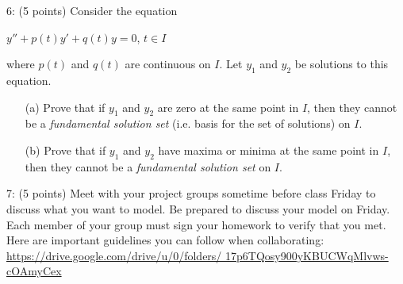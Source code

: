 \documentclass[12pt,letterpaper]{hmcpset}
\begin{document}
\begin{problem}
6: (5 points) Consider the equation
\begin{center}
    $y'' + p(t)y' + q(t)y = 0$, $t \in I$
\end{center}
where $p(t)$ and $q(t)$ are continuous on $I$. Let $y_1$ and $y_2$ be solutions to this equation.
\begin{enumerate}
    \item[(a)] Prove that if $y_1$ and $y_2$ are zero at the same point in $I$, then they cannot be a \textit{fundamental solution set} (i.e. basis for the set of solutions) on $I$.
    \item[(b)] Prove that if $y_1$ and $y_2$ have maxima or minima at the same point in $I$, then they cannot be a \textit{fundamental solution set} on $I$.
\end{enumerate}
\end{problem}
\newpage

\begin{problem}
7: (5 points) Meet with your project groups sometime before class Friday to discuss what
you want to model. Be prepared to discuss your model on Friday. Each member of
your group must sign your homework to verify that you met. Here are important guidelines
you can follow when collaborating:
\url{https://drive.google.com/drive/u/0/folders/
17p6TQosy900yKBUCWqMlvws-cOAmyCex}


\end{problem}
\newpage
\end{document}
